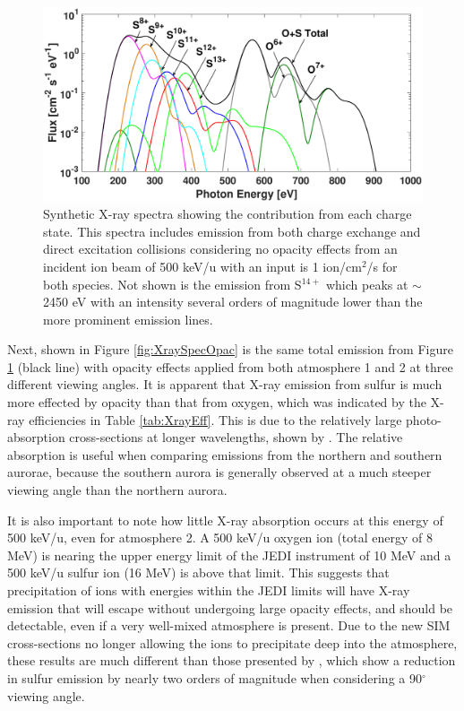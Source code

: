 \documentclass[draft]{agujournal2018}
\begin{document}
\begin{figure}[ht]
    \centering
    \includegraphics[width=\textwidth]{Figures/O+S_CX+DE_500keVNoOpacSpec.eps}
    \caption{Synthetic X-ray spectra showing the contribution from each charge state. This spectra includes emission from both charge exchange and direct excitation collisions considering no opacity effects from an incident ion beam of 500 keV/u with an input is 1 ion/cm$^2$/s for both species. Not shown is the emission from S$^{14+}$ which peaks at $\sim$2450 eV with an intensity several orders of magnitude lower than the more prominent emission lines.}
    \label{fig:XraySpec}
\end{figure}

Next, shown in Figure \ref{fig:XraySpecOpac} is the same total emission from Figure \ref{fig:XraySpec} (black line) with opacity effects applied from both atmosphere 1 and 2 at three different viewing angles.
It is apparent that X-ray emission from sulfur is much more effected by opacity than that from oxygen, which was indicated by the X-ray efficiencies in Table \ref{tab:XrayEff}.
This is due to the relatively large photo-absorption cross-sections at longer wavelengths, shown by \citet{cravens2006}.
The relative absorption is useful when comparing emissions from the northern and southern aurorae, because the southern aurora is generally observed at a much steeper viewing angle than the northern aurora.

It is also important to note how little X-ray absorption occurs at this energy of 500 keV/u, even for atmosphere 2.
A 500 keV/u oxygen ion (total energy of 8 MeV) is nearing the upper energy limit of the JEDI instrument of 10 MeV \citep{mauk2017ssr} and a 500 keV/u sulfur ion (16 MeV) is above that limit.
This suggests that precipitation of ions with energies within the JEDI limits will have X-ray emission that will escape without undergoing large opacity effects, and should be detectable, even if a very well-mixed atmosphere is present.
Due to the new SIM cross-sections no longer allowing the ions to precipitate deep into the atmosphere, these results are much different than those presented by \citet{ozak2010}, which show a reduction in sulfur emission by nearly two orders of magnitude when considering a 90$^{\circ}$ viewing angle.
\end{document}
